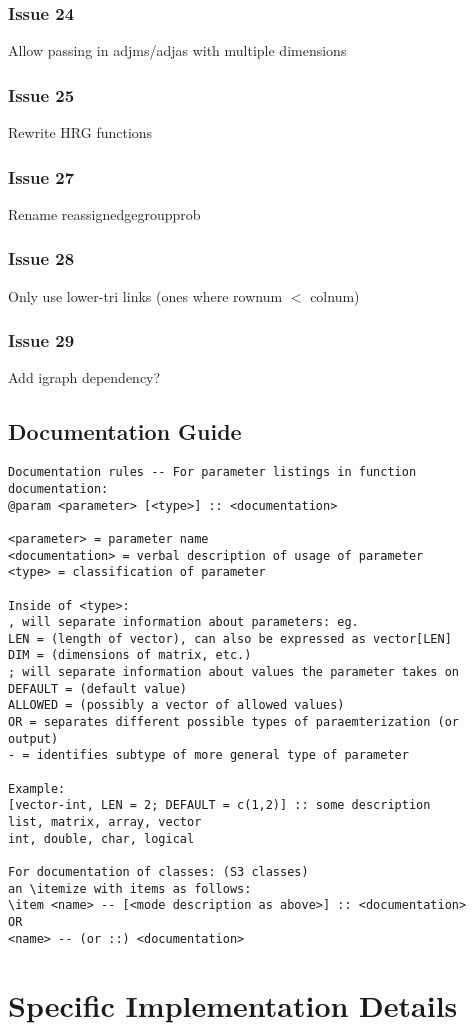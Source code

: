 \documentclass[11pt]{article}
\begin{document}
\subsubsection*{Issue 24}
Allow passing in adjms/adjas with multiple dimensions

\subsubsection*{Issue 25}
Rewrite HRG functions

\subsubsection*{Issue 27}
Rename reassignedgegroupprob

\subsubsection*{Issue 28}
Only use lower-tri links (ones where rownum $<$ colnum)

\subsubsection*{Issue 29}
Add igraph dependency?






\pagebreak

\subsection{Documentation Guide}
\begin{verbatim}
Documentation rules -- For parameter listings in function documentation: 
@param <parameter> [<type>] :: <documentation>

<parameter> = parameter name
<documentation> = verbal description of usage of parameter
<type> = classification of parameter

Inside of <type>: 
, will separate information about parameters: eg. 
LEN = (length of vector), can also be expressed as vector[LEN]
DIM = (dimensions of matrix, etc.)
; will separate information about values the parameter takes on
DEFAULT = (default value)
ALLOWED = (possibly a vector of allowed values)
OR = separates different possible types of paraemterization (or output)
- = identifies subtype of more general type of parameter

Example: 
[vector-int, LEN = 2; DEFAULT = c(1,2)] :: some description
list, matrix, array, vector
int, double, char, logical

For documentation of classes: (S3 classes)
an \itemize with items as follows: 
\item <name> -- [<mode description as above>] :: <documentation>
OR 
<name> -- (or ::) <documentation>
\end{verbatim}


\section{Specific Implementation Details}
\end{document}
